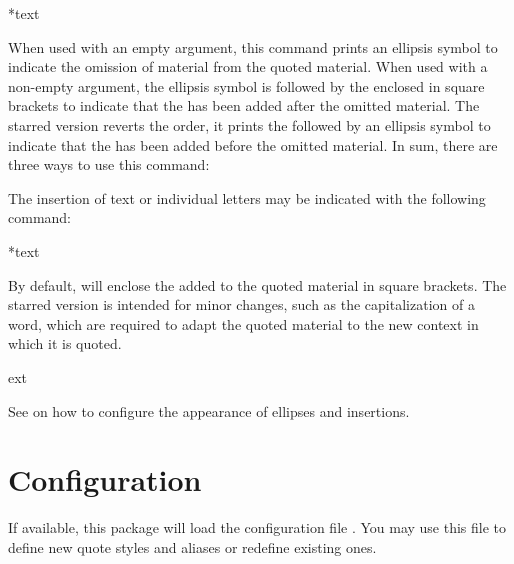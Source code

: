 \documentclass{ltxdockit}[2010/09/26]
\begin{document}
\begin{ltxsyntax}

*{text}

When used with an empty  argument, this command prints an ellipsis symbol to indicate the omission of material from the quoted material. When used with a non-empty argument, the ellipsis symbol is followed by the  enclosed in square brackets to indicate that the  has been added after the omitted material. The starred version reverts the order, \ie it prints the  followed by an ellipsis symbol to indicate that the  has been added before the omitted material. In sum, there are three ways to use this command:

\begin{ltxcode}[escapechar={\%},escapebegin={\rmfamily}]
\textelp{}	%
\end{ltxcode}
%
The insertion of text or individual letters may be indicated with the following command:

*{text}

By default,  will enclose the  added to the quoted material in square brackets. The starred version is intended for minor changes, such as the capitalization of a word, which are required to adapt the quoted material to the new context in which it is quoted.

\begin{ltxcode}[escapechar={\%},escapebegin={\rmfamily}]
ext	%
\end{ltxcode}
%
See  on how to configure the appearance of ellipses and insertions.

\end{ltxsyntax}

\section{Configuration}
\label{cfg}

If available, this package will load the configuration file . You may use this file to define new quote styles and aliases or redefine existing ones.
\end{document}
